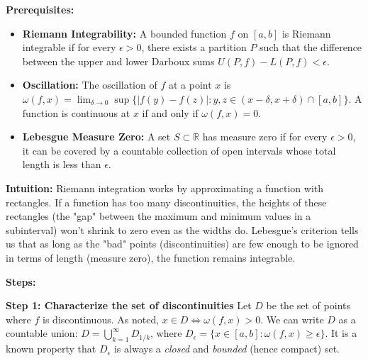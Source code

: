 \begin{solution}
\textbf{Prerequisites:}
\begin{itemize}
    \item \textbf{Riemann Integrability:} A bounded function $f$ on $[a, b]$ is Riemann integrable if for every $\epsilon > 0$, there exists a partition $P$ such that the difference between the upper and lower Darboux sums $U(P, f) - L(P, f) < \epsilon$.
    \item \textbf{Oscillation:} The oscillation of $f$ at a point $x$ is $\omega(f, x) = \lim_{\delta \to 0} \sup \{|f(y) - f(z)| : y, z \in (x-\delta, x+\delta) \cap [a, b]\}$. A function is continuous at $x$ if and only if $\omega(f, x) = 0$.
    \item \textbf{Lebesgue Measure Zero:} A set $S \subset \mathbb{R}$ has measure zero if for every $\epsilon > 0$, it can be covered by a countable collection of open intervals whose total length is less than $\epsilon$.
\end{itemize}

\textbf{Intuition:}
Riemann integration works by approximating a function with rectangles. If a function has too many discontinuities, the heights of these rectangles (the "gap" between the maximum and minimum values in a subinterval) won't shrink to zero even as the widths do. Lebesgue's criterion tells us that as long as the "bad" points (discontinuities) are few enough to be ignored in terms of length (measure zero), the function remains integrable.

\textbf{Steps:}

\textbf{Step 1: Characterize the set of discontinuities}
Let $D$ be the set of points where $f$ is discontinuous. As noted, $x \in D \iff \omega(f, x) > 0$.
We can write $D$ as a countable union: $D = \bigcup_{k=1}^\infty D_{1/k}$, where $D_\epsilon = \{x \in [a, b] : \omega(f, x) \geq \epsilon\}$.
It is a known property that $D_\epsilon$ is always a \textit{closed} and \textit{bounded} (hence compact) set.


\end{solution}
